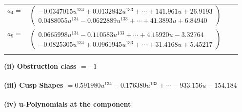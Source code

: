 \documentclass[1p]{elsarticle_modified}
\theoremstyle{definition}
\begin{document}
\begin{tabular}{m{7pt} m{180pt} m{7pt} m{180pt} }
\flushright $a_{4}=$&$\begin{pmatrix}-0.0347015 u^{134}+0.0132842 u^{133}+\cdots+141.961 u+26.9193\\0.0488055 u^{134}-0.0622889 u^{133}+\cdots+41.3893 u+6.84940\end{pmatrix}$ \\
\flushright $a_{9}=$&$\begin{pmatrix}0.0665998 u^{134}-0.110583 u^{133}+\cdots+4.15920 u-3.32764\\-0.0825305 u^{134}+0.0961945 u^{133}+\cdots+31.4168 u+5.45217\end{pmatrix}$\\&\end{tabular}
\flushleft \textbf{(ii) Obstruction class $= -1$}\\~\\
\flushleft \textbf{(iii) Cusp Shapes $= 0.591980 u^{134}-0.176380 u^{133}+\cdots-933.156 u-154.184$}\\~\\
\newpage\renewcommand{\arraystretch}{1}
\flushleft \textbf{(iv) u-Polynomials at the component}\newline \\
\end{document}
